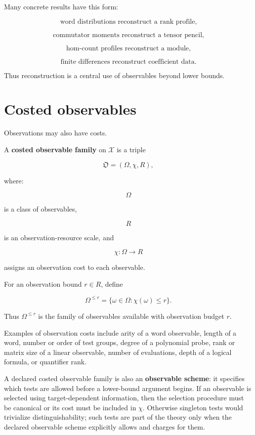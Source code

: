 \documentclass[11pt]{article}
\begin{document}
Many concrete results have this form:

\[
\text{word distributions reconstruct a rank profile,}
\]

\[
\text{commutator moments reconstruct a tensor pencil,}
\]

\[
\text{hom-count profiles reconstruct a module,}
\]

\[
\text{finite differences reconstruct coefficient data.}
\]

Thus reconstruction is a central use of observables beyond lower bounds.


\section{Costed observables}

Observations may also have costs.

A \textbf{costed observable family} on \(\mathcal X\) is a triple

\[
\mathfrak O=(\Omega,\chi,R),
\]

where:

\[
\Omega
\]

is a class of observables,

\[
R
\]

is an observation-resource scale, and

\[
\chi:\Omega\to R
\]

assigns an observation cost to each observable.

For an observation bound \(r\in R\), define

\[
\Omega^{\leq r}=\{\omega\in\Omega:\chi(\omega)\leq r\}.
\]

Thus \(\Omega^{\leq r}\) is the family of observables available with observation budget \(r\).

Examples of observation costs include arity of a word observable, length of a word, number or order of test groups, degree of a polynomial probe, rank or matrix size of a linear observable, number of evaluations, depth of a logical formula, or quantifier rank.

A declared costed observable family is also an \textbf{observable scheme}: it specifies which tests are allowed before a lower-bound argument begins. If an observable is selected using target-dependent information, then the selection procedure must be canonical or its cost must be included in \(\chi\). Otherwise singleton tests would trivialize distinguishability; such tests are part of the theory only when the declared observable scheme explicitly allows and charges for them.
\end{document}
